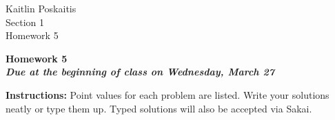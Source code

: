 \documentclass[11pt]{article}
\begin{document}
\sloppy

\noindent Kaitlin Poskaitis \\
Section 1\\
Homework 5\\

\begin{center}
\LARGE{\textbf{Homework 5}}\\
\large{\textbf{\emph{Due at the beginning of class on Wednesday, March 27}}}
\end{center}

\vspace{.1in}

\noindent\textbf{Instructions:} Point values for each problem are listed.
Write your solutions neatly or type them up.  Typed solutions will also be
accepted via Sakai.
\end{document}
